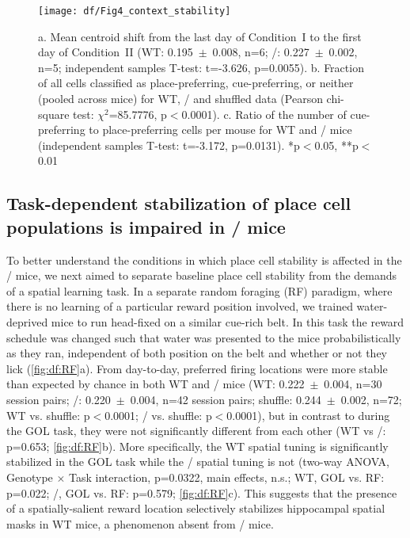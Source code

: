 \begin{figure}
	\centering
	\texttt{[image: df/Fig4\_context\_stability]}
	\caption[Subtle contextual change induces remapping in \df/ mice]{a. Mean centroid shift from the last day of Condition~I to the first day of Condition~II (WT: 0.195~$\pm$~0.008, n=6; \df/: 0.227~$\pm$~0.002, n=5; independent samples T-test: t=-3.626, p=0.0055).
	b. Fraction of all cells classified as place-preferring, cue-preferring, or neither (pooled across mice) for WT, \df/ and shuffled data (Pearson chi-square test: $\chi^2$=85.7776, p$<$0.0001).
	c. Ratio of the number of cue-preferring to place-preferring cells per mouse for WT and \df/ mice (independent samples T-test: t=-3.172, p=0.0131). *p$<$0.05, **p$<$0.01}
	\label{fig:df:context_stability}
\end{figure}

\subsection{Task-dependent stabilization of place cell populations is impaired in \df/ mice}
\label{sec:df:results:rf}
To better understand the conditions in which place cell stability is affected in the \df/ mice, we next aimed to separate baseline place cell stability from the demands of a spatial learning task.  In a separate random foraging (RF) paradigm, where there is no learning of a particular reward position involved, we trained water-deprived mice to run head-fixed on a similar cue-rich belt. In this task the reward schedule was changed such that water was presented to the mice probabilistically as they ran, independent of both position on the belt and whether or not they lick (\autoref{fig:df:RF}a). From day-to-day, preferred firing locations were more stable than expected by chance in both WT and \df/ mice (WT: 0.222~$\pm$~0.004, n=30 session pairs; \df/: 0.220~$\pm$~0.004, n=42 session pairs; shuffle: 0.244~$\pm$~0.002, n=72; WT vs. shuffle: p$<$0.0001; \df/ vs. shuffle: p$<$0.0001), but in contrast to during the GOL task, they were not significantly different from each other (WT vs \df/: p=0.653; \autoref{fig:df:RF}b). More specifically, the WT spatial tuning is significantly stabilized in the GOL task while the \df/ spatial tuning is not (two-way ANOVA, Genotype $\times$ Task interaction, p=0.0322, main effects, n.s.; WT, GOL vs. RF: p=0.022; \df/, GOL vs. RF: p=0.579; \autoref{fig:df:RF}c). This suggests that the presence of a spatially-salient reward location selectively stabilizes hippocampal spatial masks in WT mice, a phenomenon absent from \df/ mice.

